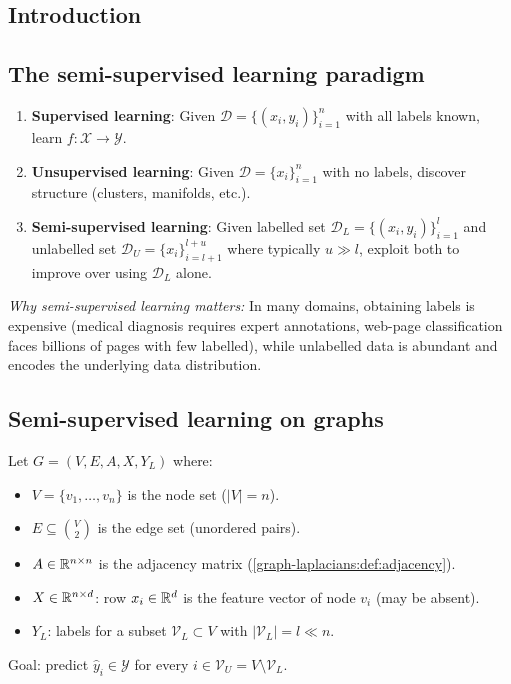 \begin{notechapter}
\section{Introduction}

\subsection{The semi-supervised learning paradigm}

\begin{definition}
\label{semi-supervised-graphs:def:paradigms}
\leavevmode
\begin{enumerate}
    \item \textbf{Supervised learning}: Given $\mathcal{D} = \{(x_i, y_i)\}_{i=1}^n$
      with all labels known, learn $f: \mathcal{X} \to \mathcal{Y}$.
    \item \textbf{Unsupervised learning}: Given $\mathcal{D} = \{x_i\}_{i=1}^n$
      with no labels, discover structure (clusters, manifolds, etc.).
    \item \textbf{Semi-supervised learning}: Given labelled set
      $\mathcal{D}_L = \{(x_i, y_i)\}_{i=1}^l$ and unlabelled set
      $\mathcal{D}_U = \{x_i\}_{i=l+1}^{l+u}$ where typically $u \gg l$,
      exploit both to improve over using $\mathcal{D}_L$ alone.
\end{enumerate}
\end{definition}

\begin{intuition}
\emph{Why semi-supervised learning matters:}
In many domains, obtaining labels is expensive (medical diagnosis requires
expert annotations, web-page classification faces billions of pages with few
labelled), while unlabelled data is abundant and encodes the underlying data
distribution.
\end{intuition}

\subsection{Semi-supervised learning on graphs}

\begin{definition}
\label{semi-supervised-graphs:def:ssl_graph}
Let $G = (V, E, A, X, Y_L)$ where:
\begin{itemize}
    \item $V = \{v_1, \ldots, v_n\}$ is the node set ($|V|=n$).
    \item $E \subseteq \binom{V}{2}$ is the edge set (unordered pairs).
    \item $A \in \mathbb{R}^{n \times n}$ is the adjacency matrix
      (\cref{graph-laplacians:def:adjacency}).
    \item $X \in \mathbb{R}^{n \times d}$: row $x_i \in \mathbb{R}^d$ is the feature vector
      of node $v_i$ (may be absent).
    \item $Y_L$: labels for a subset $\mathcal{V}_L \subset V$ with
      $|\mathcal{V}_L| = l \ll n$.
\end{itemize}
Goal: predict $\hat{y}_i \in \mathcal{Y}$ for every $i \in \mathcal{V}_U =
V \setminus \mathcal{V}_L$.
\end{definition}


\end{notechapter}
